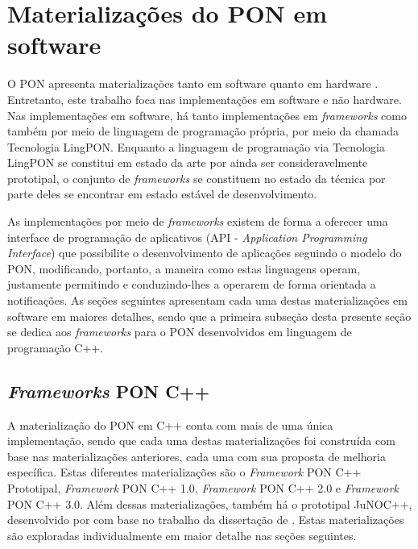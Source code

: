 \clearpage
\section{Materializações do PON em software}\label{sec:frameworks}

O PON apresenta materializações tanto em software quanto em hardware
\cite{doc_linhares_2015,doc_Kerschbaumer_2018,doc_ronszcka_2019,doc_Schutz_2019}.
Entretanto, este trabalho foca nas implementações em software e não hardware.
Nas implementações em software, há tanto implementações em \textit{frameworks}
como também por meio de linguagem de programação própria, por meio da chamada
Tecnologia LingPON. Enquanto a linguagem de programação via Tecnologia LingPON
se constitui em estado da arte por ainda ser consideravelmente prototipal, o
conjunto de \textit{frameworks} se constituem no estado da técnica por parte
deles se encontrar em estado estável de desenvolvimento.

As implementações por meio de \textit{frameworks} existem de forma a oferecer
uma interface de programação de aplicativos (API - \textit{Application
Programming Interface}) que possibilite o desenvolvimento de aplicações seguindo
o modelo do PON, modificando, portanto, a maneira como estas linguagens operam,
justamente permitindo e conduzindo-lhes a operarem de forma orientada a
notificações. As seções seguintes apresentam cada uma destas materializações em
software em maiores detalhes, sendo que a primeira subseção desta presente seção
se dedica aos \textit{frameworks} para o PON desenvolvidos em linguagem de
programação C++.

\subsection{\textit{Frameworks} PON C++}

A materialização do PON em C++ conta com mais de uma única implementação, sendo
que cada uma destas materializações foi construída com base nas materializações
anteriores, cada uma com sua proposta de melhoria específica. Estas diferentes
materializações são o \textit{Framework} PON C++ Prototipal, \textit{Framework}
PON C++ 1.0, \textit{Framework} PON C++ 2.0 e \textit{Framework} PON C++ 3.0.
Além dessas materializações, também há o prototipal JuNOC++, desenvolvido por
 com base no trabalho da dissertação de
. Estas materializações são exploradas
individualmente em maior detalhe nas seções seguintes.

